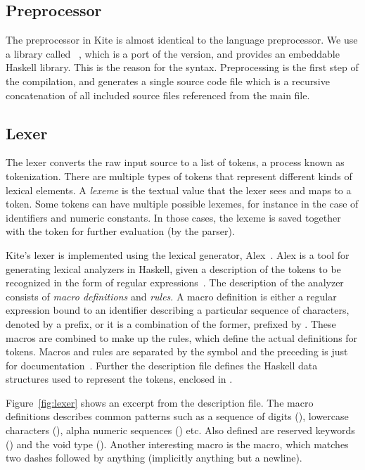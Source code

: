 
\subsection{Preprocessor}
The preprocessor in Kite is almost identical to the  language preprocessor. We use a library called ~\cite{wallace04}, which is a port of the  version, and provides an embeddable Haskell library. This is the reason for the  syntax. Preprocessing is the first step of the compilation, and generates a single source code file which is a recursive concatenation of all included source files referenced from the main file.


\subsection{Lexer}
\label{sec:impl-lexer}
The lexer converts the raw input source to a list of tokens, a process known as tokenization. There are multiple types of tokens that represent different kinds of lexical elements. A \emph{lexeme} is the textual value that the lexer sees and maps to a token. Some tokens can have multiple possible lexemes, for instance in the case of identifiers and numeric constants. In those cases, the lexeme is saved together with the token for further evaluation (by the parser).

Kite's lexer is implemented using the lexical generator, Alex~\cite{dornan01}. Alex is a tool for generating lexical analyzers in Haskell, given a description of the tokens to be recognized in the form of regular expressions~\cite[p. 4]{dornan01}. The description of the analyzer consists of \emph{macro definitions} and \emph{rules}. A macro definition is either a regular expression bound to an identifier describing a particular sequence of characters, denoted by a \code{\$} prefix, or it is a combination of the former, prefixed by . These macros are combined to make up the rules, which define the actual definitions for tokens. Macros and rules are separated by the symbol \code{:-} and the preceding  is just for documentation~\cite[p. 7]{dornan01}. Further the description file defines the Haskell data structures used to represent the tokens, enclosed in \code{\{ \}}.

Figure~\ref{fig:lexer} shows an excerpt from the description file. The macro definitions describes common patterns such as a sequence of digits (), lowercase characters (), alpha numeric sequences () etc. Also defined are reserved keywords (\code{\@keywords}) and the void type (). Another interesting macro is the  macro, which matches two dashes followed by anything (implicitly anything but a newline).

